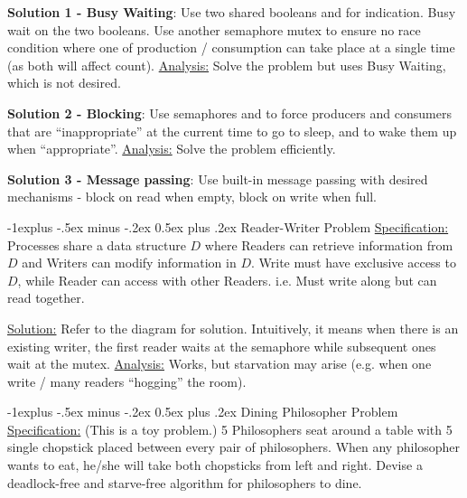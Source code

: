 \documentclass[10pt,landscape,letterpaper]{article}
\makeatletter
\renewcommand{\subsection}{\@startsection{subsection}{2}{0mm}%
                                {-1explus -.5ex minus -.2ex}%
                                {0.5ex plus .2ex}%
                                {\sffamily\normalsize\itshape}}
\makeatother
\begin{document}
\begin{multicols}{3}
\medskip

\textbf{Solution 1 - Busy Waiting}: Use two shared booleans  and  for indication. Busy wait on the two booleans. Use another semaphore mutex to ensure no race condition where one of production / consumption can take place at a single time (as both will affect count). \underline{Analysis:} Solve the problem but uses Busy Waiting, which is not desired.

\medskip

\textbf{Solution 2 - Blocking}: Use semaphores  and  to force producers and consumers that are “inappropriate” at the current time to go to sleep, and to wake them up when “appropriate”. \underline{Analysis:} Solve the problem efficiently.

\medskip

\textbf{Solution 3 - Message passing}: Use built-in message passing with desired mechanisms - block on read when empty, block on write when full.


\subsection{Reader-Writer Problem}
\underline{Specification:} Processes share a data structure $D$ where Readers can retrieve information from $D$ and Writers can modify information in $D$. Write must have exclusive access to $D$, while Reader can access with other Readers. i.e. Must write along but can read together.

\medskip

\underline{Solution:} Refer to the diagram for solution. Intuitively, it means when there is an existing writer, the first reader waits at the semaphore while subsequent ones wait at the mutex. \underline{Analysis:} Works, but starvation may arise (e.g. when one write / many readers “hogging” the room).


\subsection{Dining Philosopher Problem}
\underline{Specification:} (This is a toy problem.) 5 Philosophers seat around a table with 5 single chopstick placed between every pair of philosophers. When any philosopher wants to eat, he/she will take both chopsticks from left and right. Devise a deadlock-free and starve-free algorithm for philosophers to dine.

\medskip


\end{multicols}
\end{document}
